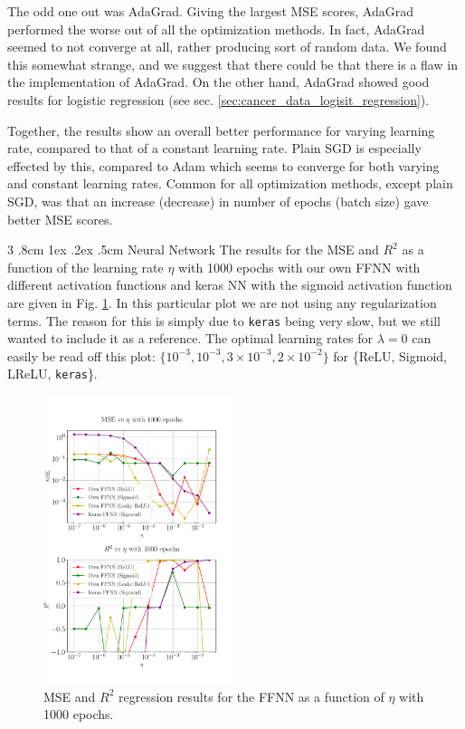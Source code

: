 \documentclass[%
reprint,s
amsmath,amssymb,
aps,
]{revtex4-2}
\makeatletter
\renewcommand{\subsubsection}{%
	\@startsection
	{subsubsection}%
	{3}%
	{\z@}%
	{.8cm \@plus1ex \@minus .2ex}%
	{.5cm}%
	{\normalfont\small\centering}%
}
\makeatother
\begin{document}
The odd one out was AdaGrad. Giving the largest MSE scores, AdaGrad performed the worse out of all the optimization methods. In fact, AdaGrad seemed to not converge at all, rather producing sort of random data. We found this somewhat strange, and we suggest that there could be that there is a flaw in the implementation of AdaGrad. On the other hand, AdaGrad showed good results for logistic regression (see sec. \ref{sec:cancer_data_logisit_regression}).

Together, the results show an overall better performance for varying learning rate, compared to that of a constant learning rate. Plain SGD is especially effected by this, compared to Adam which seems to converge for both varying and constant learning rates. Common for all optimization methods, except plain SGD, was that an increase (decrease) in number of epochs (batch size) gave better MSE scores.

\subsubsection{Neural Network}
The results for the MSE and $R^2$ as a function of the learning rate $\eta$ with 1000 epochs with our own FFNN with different activation functions and keras NN with the sigmoid activation function are given in Fig. \ref{fig:NN_Franke_LR_1000}. In this particular plot we are not using any regularization terms. The reason for this is simply due to \texttt{keras} being very slow, but we still wanted to include it as a reference. The optimal learning rates for $\lambda=0$ can easily be read off this plot: $\{10^{-3},10^{-3},3\times10^{-3},2\times 10^{-2}\}$ for \{ReLU, Sigmoid, LReLU, \texttt{keras}\}.
\begin{figure}[ht!]
	\includegraphics[width=0.5\textwidth]{Figures/NN_MSE_R2_Franke_LearningRate_Epochs1000.pdf}
	\caption{MSE and $R^2$ regression results for the FFNN as a function of $\eta$ with 1000 epochs.}
	\label{fig:NN_Franke_LR_1000}
\end{figure}
\end{document}

